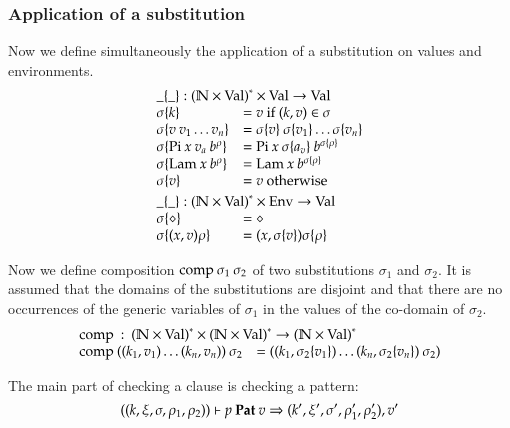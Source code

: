 \subsubsection{Application of a substitution}
Now we define simultaneously the application of a substitution on values and environments.
\[
\begin{array}{ll}
\multicolumn{2}{l}{\subst{\_}{\_} : \ves{(\cN \times \Val)} \times \Val \ra \Val} \\
\subst{\sigma}{k} & = v \mbox{ if } (k,v) \in \sigma \\
\subst{\sigma}{v \: v_1 \ldots v_n} & = \subst{\sigma}{v} \: \subst{\sigma}{v_1} \ldots \subst{\sigma}{v_n}\\
\subst{\sigma}{\vpi \: x \: v_a \: \cl{b}{\rho}} & = \vpi \: x \: \subst{\sigma}{a_v} \: \cl{b}{\subst{\sigma}{\rho}} \\
\subst{\sigma}{\vlam \: x \: \cl{b}{\rho}} & = \vlam \: x \: \cl{b}{\subst{\sigma}{\rho}} \\
\subst{\sigma}{v} & = v \mbox{ otherwise }
\vs\\
\multicolumn{2}{l}{\substEnv{\_}{\_} : \ves{(\cN \times \Val)} \times \Env \ra \Val} \\
\substEnv{\sigma}{\diamond} & = \diamond \\
\substEnv{\sigma}{(x,v)\rho} & = (x,\subst{\sigma}{v}) \substEnv{\sigma}{\rho} \\
\end{array}
\]

Now we define composition $\mathrm{comp}\:\sigma_1\:\sigma_2$ of two substitutions $\sigma_1$ and $\sigma_2$.
It is assumed that the domains of the substitutions are disjoint and that there are no occurrences of the generic variables of $\sigma_1$ in the values of the co-domain of $\sigma_2$.  
\[
\begin{array}{ll}
\multicolumn{2}{l}{\compS : \ves{(\cN \times \Val)} \times \ves{(\cN \times \Val)} \ra \ves{(\cN \times \Val)}} \\
\compS{((k_1,v_1)\ldots(k_n,v_n))}{\sigma_2} & = ((k_1,\subst{\sigma_2}{v_1})\ldots(k_n,\subst{\sigma_2}{v_n})\: \sigma_2) 
\end{array}
\]

The main part of checking a clause is checking a pattern:
\[
((k,\xi,\sigma,\rho_1,\rho_2))\vdash p\:\mathbf{Pat}\:v\Rightarrow (k',\xi',\sigma',\rho'_1,\rho'_2),v'
\]

